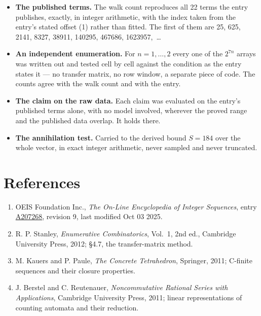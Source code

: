 \documentclass[11pt]{article}
\theoremstyle{definition}
\begin{document}
\begin{itemize}

\item {\bfseries The published terms.} The walk count reproduces all 22 terms the entry publishes, exactly, in integer arithmetic, with the index taken from the entry's stated offset (1) rather than fitted. The first of them are 25, 625, 2141, 8327, 38911, 140295, 467686, 1623957,~\dots

\item {\bfseries An independent enumeration.} For $n = 1,\dots,2$ every one of the $2^{7n}$ arrays was written out and tested cell by cell against the condition as the entry states it --- no transfer matrix, no row window, a separate piece of code. The counts agree with the walk count and with the entry.

\item {\bfseries The claim on the raw data.} Each claim was evaluated on the entry's published terms alone, with no model involved, wherever the proved range and the published data overlap. It holds there.

\item {\bfseries The annihilation test.} Carried to the derived bound $S = 184$ over the whole vector, in exact integer arithmetic, never sampled and never truncated.

\end{itemize}

\section{References}

\begin{enumerate}

\item OEIS Foundation Inc., \emph{The On-Line Encyclopedia of Integer Sequences}, entry \href{https://oeis.org/A207268}{A207268}, revision 9, last modified Oct 03 2025.

\item R. P. Stanley, \emph{Enumerative Combinatorics}, Vol.~1, 2nd ed., Cambridge University Press, 2012; \S4.7, the transfer-matrix method.

\item M. Kauers and P. Paule, \emph{The Concrete Tetrahedron}, Springer, 2011; C-finite sequences and their closure properties.

\item J. Berstel and C. Reutenauer, \emph{Noncommutative Rational Series with Applications}, Cambridge University Press, 2011; linear representations of counting automata and their reduction.

\end{enumerate}
\end{document}
